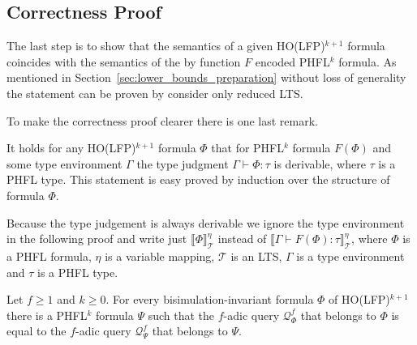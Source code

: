 \subsection{Correctness Proof}\label{subsec:lower_bounds_correctness_lfp}

The last step is to show that the semantics of a given HO(LFP)$^{k+1}$ formula coincides with the semantics of the by function $F$ encoded PHFL$^k$ formula. As mentioned in Section~\ref{sec:lower_bounds_preparation} without loss of generality the statement can be proven by consider only  reduced LTS. 

To make the correctness proof clearer there is one last remark.

\begin{remark}
    It holds for any HO(LFP)$^{k+1}$ formula $\Phi$ that for PHFL$^k$ formula $F(\Phi)$ and some type environment $\Gamma$ the type judgment $\Gamma \vdash
    \Phi \colon \tau$ is derivable, where $\tau$ is a PHFL type. This statement
    is easy proved by induction over the structure of formula $\Phi$. 
\end{remark}

Because the type judgement is always derivable we ignore the type environment in the following proof and write just $\llbracket \Phi \rrbracket^\eta_\mathcal{T}$ instead of $\llbracket \Gamma \vdash F(\Phi) \colon \tau \rrbracket^\eta_\mathcal{T}$, where $\Phi$ is a PHFL formula, $\eta$ is a variable mapping, $\mathcal{T}$ is an LTS, $\Gamma$ is a type environment and $\tau$ is a PHFL type.

\begin{lemma}
    \label{lemma:ho_lfp_equals_phfl}
    Let $f \geq 1$ and $k \geq 0$. For every bisimulation-invariant formula $\Phi$ of HO(LFP)$^{k + 1}$ there is a
    PHFL$^k$ formula $\Psi$ such that the $f$-adic query $\mathcal{Q}_\Phi^f$ that belongs to $\Phi$ is equal to the $f$-adic query  $\mathcal{Q}_\Psi^f$ that belongs to $\Psi$.
\end{lemma}

